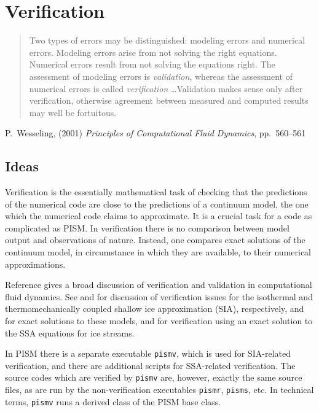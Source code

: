
\section{Verification}\label{sec:verif}

\bigskip
\begin{quote}  Two types of errors may be distinguished: modeling errors and numerical errors.  Modeling errors arise from not solving the right equations.  Numerical errors result from not solving the equations right.  The assessment of modeling errors is \emph{validation}, whereas the assessment of numerical errors is called \emph{verification} \dots  Validation makes sense only after verification, otherwise agreement between measured and computed results may well be fortuitous.
\end{quote}
\hfill P.~Wesseling, (2001)  \emph{Principles of Computational Fluid Dynamics}, pp.~560--561 \cite{Wesseling}
\bigskip

\subsection{Ideas}  Verification is the essentially mathematical task of checking that the predictions of the numerical code are close to the predictions of a continuum model, the one which the numerical code claims to approximate.  It is a crucial task for a code as complicated as PISM. In verification there is no comparison between model output and observations of nature.  Instead, one compares exact solutions of the continuum model, in circumstance in which they are available, to their numerical approximations.

Reference \cite{Roache} gives a broad discussion of verification and validation in computational fluid dynamics. See \cite{BLKCB} and \cite{BBL} for discussion of verification issues for the isothermal and thermomechanically coupled shallow ice approximation (SIA), respectively, and for exact solutions to these models, and \cite{BBssasliding,SchoofStream} for verification using an exact solution to the SSA equations for ice streams.  

In PISM there is a separate executable \texttt{pismv}, which is used
for SIA-related verification, and there are additional scripts for SSA-related
verification.  The source codes which are verified by \texttt{pismv} are,
however, exactly the same source files, as are run by the
non-verification executables \texttt{pismr}, \texttt{pisms}, etc.  In
technical terms, \texttt{pismv} runs a derived class of the PISM base class.

